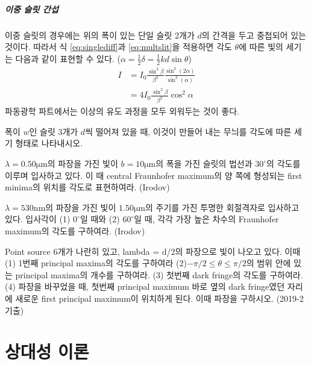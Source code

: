 \paragraph{이중 슬릿 간섭}
이중 슬릿의 경우에는 위의 폭이 있는 단일 슬릿 2개가 $d$의 간격을 두고 중첩되어 있는 것이다. 따라서 식 \ref{eq:singlediff}과  \ref{eq:multslit}을 적용하면 각도 $\theta$에 따른 빛의 세기는 다음과 같이 표현할 수 있다. ($\alpha =\frac{1}{2}\delta = \frac{1}{2}kd\sin\theta$)
\begin{align}
I&=I_0 \frac{\sin^2\beta}{\beta^2}\frac{\sin^2(2\alpha)}{\sin^2(\alpha)}\\
&=4I_0 \frac{\sin^2 \beta}{\beta^2}\cos^2\alpha
\end{align}
파동광학 파트에서는 이상의 유도 과정을 모두 외워두는 것이 좋다.
\begin{exercise}
폭이 $w$인 슬릿 3개가 $d$씩 떨어져 있을 때, 이것이 만들어 내는 무늬를 각도에 따른 세기 형태로 나타내시오.
\end{exercise}

\begin{exercise}
$\lambda=0.50\mathrm{\mu m}$의 파장을 가진 빛이 $b=10\mathrm{\mu m}$의 폭을 가진 슬릿의 법선과 $30^\circ$의 각도를 이루며 입사하고 있다. 이 때 central Fraunhofer maximum의 양 쪽에 형성되는 first minima의 위치를 각도로 표현하여라. (Irodov)
\end{exercise}

\begin{problem}
$\lambda = 530\mathrm{nm}$의 파장을 가진 빛이 $1.50\mathrm{\mu m}$의 주기를 가진 투명한 회절격자로 입사하고 있다. 입사각이 (1) $0^\circ$일 때와 (2) $60^\circ$일 때, 각각 가장 높은 차수의 Fraunhofer maximum의 각도를 구하여라. (Irodov)
\end{problem}

\begin{problem}
Point source 6개가 나란히 있고, lambda = d/2의 파장으로 빛이 나오고 있다. 이때
(1) 1번째 principal maxima의 각도를 구하여라
(2)$-\pi/2\le\theta\le\pi/2$의 범위 안에 있는 principal maxima의 개수를 구하여라.
(3) 첫번째 dark fringe의 각도를 구하여라.
(4) 파장을 바꾸었을 때, 첫번째 principal maximum 바로 옆의 dark fringe였던 자리에 새로운 first principal maximum이 위치하게 된다. 이때 파장을 구하시오. (2019-2 기출)
\end{problem}


\chapter{상대성 이론}
